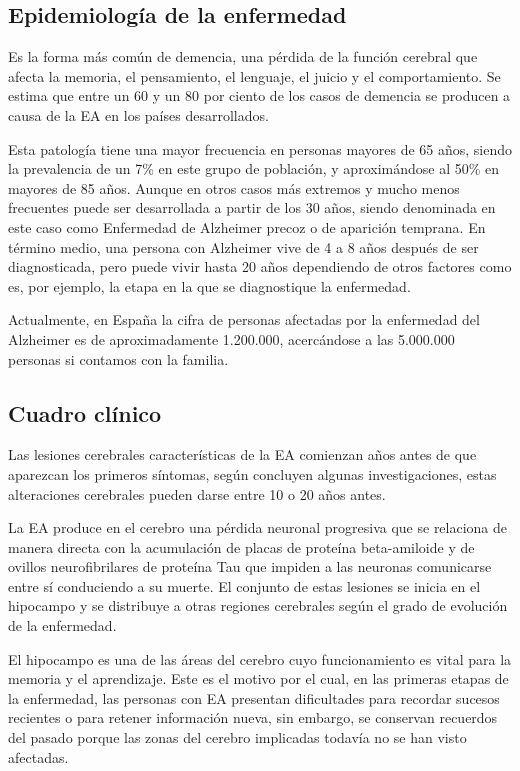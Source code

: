 \subsection{Epidemiología de la enfermedad}\label{subsec:epidemiologia}
Es la forma más común de demencia, una pérdida de la función cerebral que afecta la memoria, el pensamiento, el
lenguaje, el juicio y el comportamiento.
Se estima que entre un 60 y un 80 por ciento de los casos de demencia se producen a causa de la EA en los países
desarrollados.

Esta patología tiene una mayor frecuencia en personas mayores de 65 años, siendo la prevalencia de un 7\% en este grupo
de población, y aproximándose al 50\% en mayores de 85 años.
Aunque en otros casos más extremos y mucho menos frecuentes puede ser desarrollada a partir de los 30 años, siendo
denominada en este caso como Enfermedad de Alzheimer precoz o de aparición temprana.
En término medio, una persona con Alzheimer vive de 4 a 8 años después de ser diagnosticada, pero puede vivir hasta 20
años dependiendo de otros factores como es, por ejemplo, la etapa en la que se diagnostique la enfermedad.

Actualmente, en España la cifra de personas afectadas por la enfermedad del Alzheimer es de aproximadamente 1.200.000,
acercándose a las 5.000.000 personas si contamos con la familia.

\subsection{Cuadro clínico}\label{subsec:cuadro-clinico}
Las lesiones cerebrales características de la EA comienzan años antes de que aparezcan los primeros síntomas, según
concluyen algunas investigaciones, estas alteraciones cerebrales pueden darse entre 10 o 20 años antes.

La EA produce en el cerebro una pérdida neuronal progresiva que se relaciona de manera directa con la acumulación de
placas de proteína beta-amiloide y de ovillos neurofibrilares de proteína Tau que impiden a las neuronas comunicarse
entre sí conduciendo a su muerte.
El conjunto de estas lesiones se inicia en el hipocampo y se distribuye a otras regiones cerebrales según el grado de
evolución de la enfermedad.

El hipocampo es una de las áreas del cerebro cuyo funcionamiento es vital para la memoria y el aprendizaje.
Este es el motivo por el cual, en las primeras etapas de la enfermedad, las personas con EA presentan dificultades para
recordar sucesos recientes o para retener información nueva, sin embargo, se conservan recuerdos del pasado porque las
zonas del cerebro implicadas todavía no se han visto afectadas.

